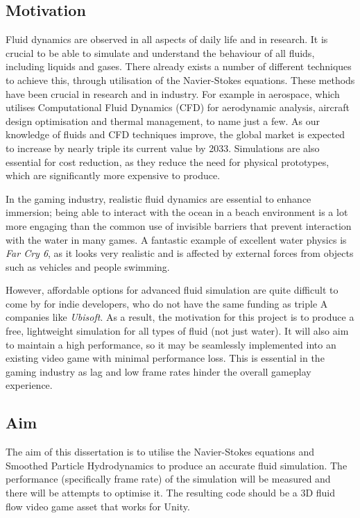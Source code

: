 \documentclass[a4paper, 12pt]{article}
\begin{document}
    \subsection{Motivation}
    Fluid dynamics are observed in all aspects of daily life and in research. It is crucial to be able to simulate and understand the behaviour of all fluids, including liquids and gases. There already exists a number of different techniques to achieve this, through utilisation of the Navier-Stokes equations. These methods have been crucial in research and in industry. For example in aerospace, which utilises Computational Fluid Dynamics (CFD) for aerodynamic analysis, aircraft design optimisation and thermal management, to name just a few. As our knowledge of fluids and CFD techniques improve, the global market is expected to increase by nearly triple its current value by 2033\cite{market}. Simulations are also essential for cost reduction, as they reduce the need for physical prototypes, which are significantly more expensive to produce.

    In the gaming industry, realistic fluid dynamics are essential to enhance immersion; being able to interact with the ocean in a beach environment is a lot more engaging than the common use of invisible barriers that prevent interaction with the water in many games. A fantastic example of excellent water physics is \textit{Far Cry 6}\cite{farcry6}, as it looks very realistic and is affected by external forces from objects such as vehicles and people swimming.
    
    However, affordable options for advanced fluid simulation are quite difficult to come by for indie developers, who do not have the same funding as triple A companies like \textit{Ubisoft}. As a result, the motivation for this project is to produce a free, lightweight simulation for all types of fluid (not just water). It will also aim to maintain a high performance, so it may be seamlessly implemented into an existing video game with minimal performance loss. This is essential in the gaming industry as lag and low frame rates hinder the overall gameplay experience.

    \subsection{Aim}
    The aim of this dissertation is to utilise the Navier-Stokes equations and Smoothed Particle Hydrodynamics to produce an accurate fluid simulation. The performance (specifically frame rate) of the simulation will be measured and there will be attempts to optimise it. The resulting code should be a 3D fluid flow video game asset that works for Unity.
\end{document}

